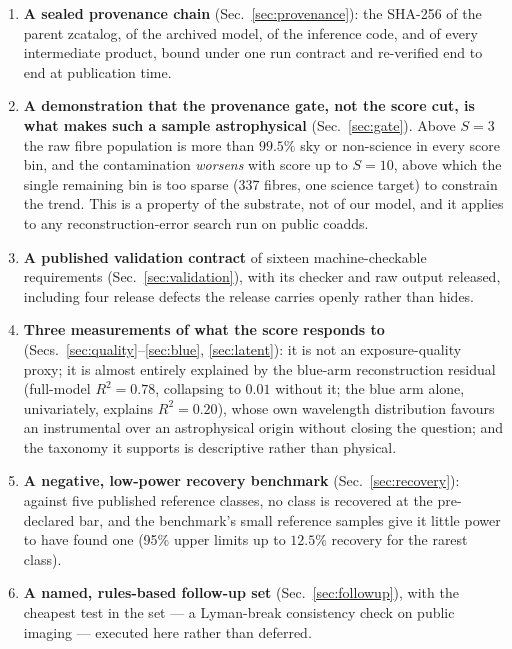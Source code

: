\documentclass[aps,prd,twocolumn,superscriptaddress,nofootinbib,longbibliography,floatfix]{revtex4-2}
\begin{document}
\begin{enumerate}[leftmargin=1.4em,itemsep=2pt]
  \item \textbf{A sealed provenance chain} (Sec.~\ref{sec:provenance}): the
    SHA-256 of the parent zcatalog, of the archived model, of the inference
    code, and of every intermediate product, bound under one run contract and
    re-verified end to end at publication time.
  \item \textbf{A demonstration that the provenance gate, not the score cut,
    is what makes such a sample astrophysical} (Sec.~\ref{sec:gate}). Above
    $S=3$ the raw fibre population is more than $99.5\%$ sky or non-science in
    every score bin, and the contamination \emph{worsens} with score up to
    $S=10$, above which the single remaining bin is too sparse (337 fibres,
    one science target) to constrain the trend. This is a property of the
    substrate, not of our model, and it applies to any reconstruction-error
    search run on public coadds.
  \item \textbf{A published validation contract} of sixteen
    machine-checkable requirements (Sec.~\ref{sec:validation}), with its
    checker and raw output released, including four release defects the
    release carries openly rather than hides.
  \item \textbf{Three measurements of what the score responds to}
    (Secs.~\ref{sec:quality}--\ref{sec:blue}, \ref{sec:latent}): it is not an exposure-quality
    proxy; it is almost entirely explained by the blue-arm reconstruction
    residual (full-model $R^2=0.78$, collapsing to $0.01$ without it;
    the blue arm alone, univariately, explains $R^2=0.20$), whose own
    wavelength distribution favours an instrumental over an astrophysical
    origin without closing the question; and the taxonomy it supports is
    descriptive rather than physical.
  \item \textbf{A negative, low-power recovery benchmark} (Sec.~\ref{sec:recovery}):
    against five published reference classes, no class is recovered at the
    pre-declared bar, and the benchmark's small reference samples give it
    little power to have found one (95\% upper limits up to $12.5\%$
    recovery for the rarest class).
  \item \textbf{A named, rules-based follow-up set}
    (Sec.~\ref{sec:followup}), with the cheapest test in the set --- a
    Lyman-break consistency check on public imaging --- executed here rather
    than deferred.
\end{enumerate}
\end{document}
